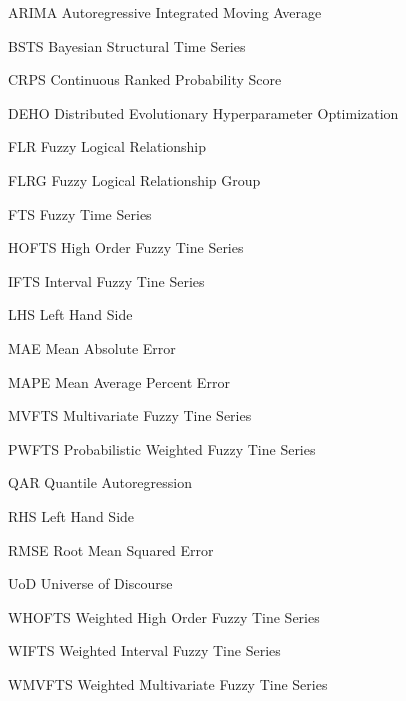 
\begin{siglas}
\item[ARIMA] Autoregressive Integrated Moving Average
\item[BSTS] Bayesian Structural Time Series
\item[CRPS] Continuous Ranked Probability Score
\item[DEHO] Distributed Evolutionary Hyperparameter Optimization
\item[FLR] Fuzzy Logical Relationship
\item[FLRG] Fuzzy Logical Relationship Group
\item[FTS] Fuzzy Time Series
\item[HOFTS] High Order Fuzzy Tine Series
\item[IFTS] Interval Fuzzy Tine Series
\item[LHS] Left Hand Side
\item[MAE] Mean Absolute Error
\item[MAPE] Mean Average Percent Error
\item[MVFTS] Multivariate Fuzzy Tine Series
\item[PWFTS] Probabilistic Weighted Fuzzy Tine Series
\item[QAR] Quantile Autoregression
\item[RHS] Left Hand Side
\item[RMSE] Root Mean Squared Error
\item[UoD] Universe of Discourse
\item[WHOFTS] Weighted High Order Fuzzy Tine Series
\item[WIFTS] Weighted Interval Fuzzy Tine Series
\item[WMVFTS] Weighted Multivariate Fuzzy Tine Series
\end{siglas}